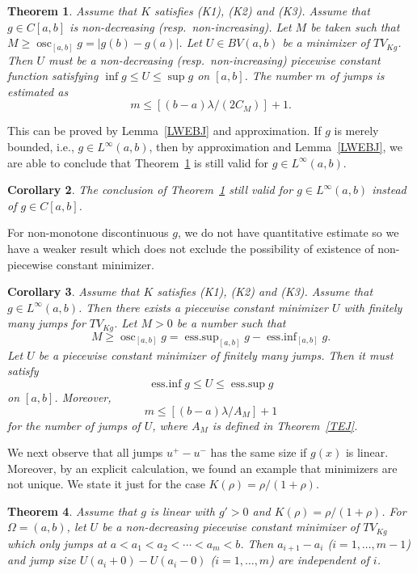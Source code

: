 \documentclass[12pt, reqno]{amsart}
\numberwithin{equation}{section}
\newtheorem{thm}{Theorem}[section]
\newtheorem{cor}[thm]{Corollary}
\DeclareMathOperator*{\osc}{osc}
\DeclareMathOperator*{\essinf}{ess.inf}
\DeclareMathOperator*{\esssup}{ess.sup}
\begin{document}
\begin{thm} \label{TMainMon}
Assume that $K$ satisfies (K1), (K2) and (K3).
 Assume that $g\in C[a,b]$ is non-decreasing (resp.\ non-increasing).
 Let $M$ be taken such that $	M\geq\operatorname{osc}_{[a,b]}g=\left|g(b)-g(a)\right|$.
 Let $U\in BV(a,b)$ be a minimizer of $TV_{Kg}$.
 Then $U$ must be a non-decreasing (resp.\ non-increasing) piecewise constant function satisfying $\inf g\leq U\leq\sup g$ on $[a,b]$.
 The number $m$ of jumps is estimated as
\[
	m \leq \left[(b-a)\lambda/(2C_M) \right] + 1.
\]
\end{thm}
This can be proved by Lemma~\ref{LWEBJ} and approximation.
 If $g$ is merely bounded, i.e., $g\in L^\infty(a,b)$, then by approximation and Lemma~\ref{LWEBJ}, we are able to conclude that Theorem~\ref{TMainMon} is still valid for $g\in L^\infty(a,b)$.
\begin{cor} \label{CMain}
The conclusion of Theorem~\ref{TMainMon} still valid for $g\in L^\infty(a,b)$ instead of $g\in C[a,b]$.
\end{cor}

For non-monotone discontinuous $g$, we do not have quantitative estimate so we have a weaker result which does not exclude the possibility of existence of non-piecewise constant minimizer.
\begin{cor} \label{CMain2}
Assume that $K$ satisfies (K1), (K2) and (K3).
 Assume that $g\in L^\infty(a,b)$.
 Then there exists a piecewise constant minimizer $U$ with finitely many jumps for $TV_{Kg}$.
 Let $M>0$ be a number such that
\[
	M \ge \osc_{[a,b]} g
	= \esssup_{[a,b]} g - \essinf_{[a,b]} g.
\]
Let $U$ be a piecewise constant minimizer of finitely many jumps.
 Then it must satisfy
\[
	\essinf g \le U \le \esssup g
\]
on $[a,b]$.
 Moreover,
\[
	m \le \left[(b-a)\lambda/A_M \right] + 1
\]
for the number of jumps of $U$, where $A_M$ is defined in Theorem~\ref{TEJ}.
\end{cor}

We next observe that all jumps $u^+-u^-$ has the same size if $g(x)$ is linear.
 Moreover, by an explicit calculation, we found an example that minimizers are not unique.
 We state it just for the case $K(\rho)=\rho/(1+\rho)$. 
%
\begin{thm} \label{TSJ}
Assume that $g$ is linear with $g'>0$ and $K(\rho)=\rho/(1+\rho)$.
 For $\Omega=(a,b)$, let $U$ be a non-decreasing piecewise constant minimizer of $TV_{Kg}$ which only jumps at $a<a_1<a_2<\cdots<a_m<b$.
 Then $a_{i+1}-a_i$ ($i=1,\ldots,m-1$) and jump size $U(a_i+0)-U(a_i-0)$ ($i=1,\ldots,m$) are independent of $i$.
\end{thm}
\end{document}
